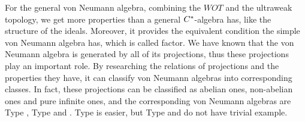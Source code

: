 For the general von Neumann algebra, combining the $WOT$ and the ultraweak topology, we get more properties than a general $C^{*}$-algebra has, like the structure of the ideals. Moreover, it provides the equivalent condition the simple von Neumann algebra has, which is called factor. We have known that the von Neumann algebra is generated by all of its projections, thus these projections play an important role. By researching the relations of projections and the properties they have, it can classify von Neumann algebras into corresponding classes. In fact, these projections can be classified as abelian ones, non-abelian ones and pure infinite ones, and the corresponding von Neumann algebras are Type , Type  and . Type  is easier, but Type  and  do not have trivial example.
